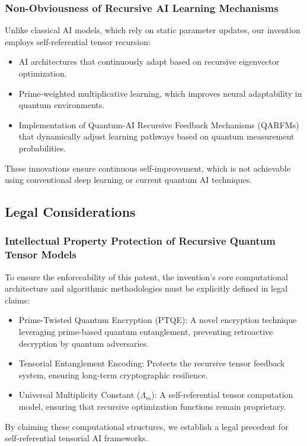 \documentclass{article}
\theoremstyle{plain}
\begin{document}
\begin{itemize}
\begin{itemize}
\subsubsection{Non-Obviousness of Recursive AI Learning Mechanisms}
Unlike classical AI models, which rely on static parameter updates, our invention employs self-referential tensor recursion:
\begin{itemize}
    \item AI architectures that continuously adapt based on recursive eigenvector optimization.
    \item Prime-weighted multiplicative learning, which improves neural adaptability in quantum environments.
    \item Implementation of Quantum-AI Recursive Feedback Mechanisms (QARFMs) that dynamically adjust learning pathways based on quantum measurement probabilities.
\end{itemize}
These innovations ensure continuous self-improvement, which is not achievable using conventional deep learning or current quantum AI techniques.

\subsection{Legal Considerations}
\subsubsection{Intellectual Property Protection of Recursive Quantum Tensor Models}
To ensure the enforceability of this patent, the invention’s core computational architecture and algorithmic methodologies must be explicitly defined in legal claims:
\begin{itemize}
    \item Prime-Twisted Quantum Encryption (PTQE): A novel encryption technique leveraging prime-based quantum entanglement, preventing retroactive decryption by quantum adversaries.
    \item Tensorial Entanglement Encoding: Protects the recursive tensor feedback system, ensuring long-term cryptographic resilience.
    \item Universal Multiplicity Constant ($\Lambda_m$): A self-referential tensor computation model, ensuring that recursive optimization functions remain proprietary.
\end{itemize}
By claiming these computational structures, we establish a legal precedent for self-referential tensorial AI frameworks.


\end{itemize}
\end{itemize}
\end{document}
